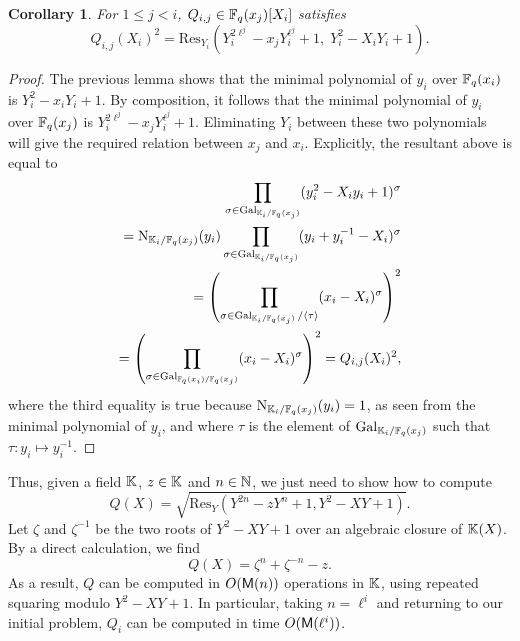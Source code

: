 \documentclass{sig-alternate}
\newtheorem{corollary}[definition]{Corollary}
\begin{document}
\begin{corollary}
  \label{th:T2-resultant}
  For $1 \le j < i$, $Q_{i,j} \in \mathbb{F}_q(x_{j})[X_i]$ satisfies
  \begin{equation*}
    \label{eq:T2-relpols}
    Q_{i,j}(X_i)^2 = \mathrm{Res}_{Y_i}(Y_i^{2\ell^j}-x_{j}Y_i^{\ell^j}+1,\; Y_i^2-X_i Y_i+1).
  \end{equation*}
\end{corollary}
\begin{proof}
  The previous lemma shows that the minimal polynomial of $y_i$ over
  $\mathbb{F}_q(x_i)$ is $Y_i^2 -x_i Y_i +1$. By composition, it follows that
  the minimal polynomial of $y_i$ over $\mathbb{F}_q(x_{j})$ is
  $Y_i^{2\ell^j}-x_{j} Y_i^{\ell^j}+1$. Eliminating $Y_i$ between
  these two polynomials will give the required relation between
  $x_{j}$ and $x_i$. Explicitly, the resultant above 
  is equal to
\begin{align*}
   \prod_{\sigma\in\operatorname{Gal}_{\mathbb{K}_i/\mathbb{F}_q(x_{j})}}
  (y_i^2 - X_i y_i + 1)^\sigma \\
  =\operatorname{N}_{\mathbb{K}_i/\mathbb{F}_q(x_{j})}(y_i) \prod_{\sigma\in\operatorname{Gal}_{\mathbb{K}_i/\mathbb{F}_q(x_{j})}} 
  (y_i + y_i^{-1} - X_i)^\sigma \\
  =\left(\prod_{\sigma\in\operatorname{Gal}_{\mathbb{K}_i/\mathbb{F}_q(x_{j})}/\langle\tau\rangle}
    (x_i - X_i)^\sigma\right)^2 \\
  =\left(\prod_{\sigma\in\operatorname{Gal}_{\mathbb{F}_q(x_i)/\mathbb{F}_q(x_{j})}}
    (x_i - X_i)^\sigma\right)^2 =Q_{i,j}(X_i)^2,
\end{align*}
where the third equality is true because
$\operatorname{N}_{\mathbb{K}_i/\mathbb{F}_q(x_{j})}(y_i)=1$, as seen from the minimal polynomial of
$y_i$, and where $\tau$ is the element of
$\operatorname{Gal}_{\mathbb{K}_i/\mathbb{F}_q(x_{j})}$ such that $\tau:y_i\mapsto y_i^{-1}$.
\end{proof}

Thus, given a field $\mathbb{K}$, $z \in \mathbb{K}$ and $n \in \mathbb{N}$, we just need to
show how to compute
\begin{equation*}
  Q(X) = \sqrt{\mathrm{Res}_Y(Y^{2 n}-z Y^n+1, Y^2-XY+1)}.
\end{equation*}
Let $\zeta$ and $\zeta^{-1}$ be the two roots of $Y^2-XY+1$ over an
algebraic closure of $\mathbb{K}(X)$. By a direct calculation, we find
\begin{equation}
  \label{eq:T2-minpols}
  Q(X) = \zeta^n + \zeta^{-n} - z.
\end{equation}
As a result, $Q$ can be computed in $O(\mathsf{M}(n))$ operations in $\mathbb{K}$,
using repeated squaring modulo $Y^2-XY+1$. In particular, taking
$n=\ell^i$ and returning to our initial problem, $Q_i$ can be computed
in time $O(\mathsf{M}(\ell^i))$. 
\end{document}
